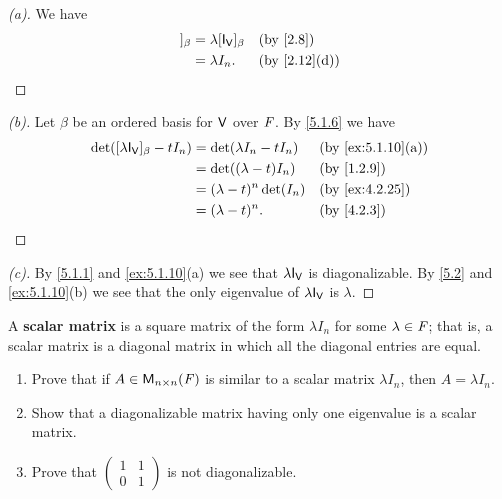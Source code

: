 \begin{proof}[(a)]
  We have
  \begin{align*}
    [\lambda \IT[\V]]_{\beta} & = \lambda [\IT[\V]]_{\beta} &  & \text{(by \cref{2.8})}     \\
                              & = \lambda I_n.              &  & \text{(by \cref{2.12}(d))}
  \end{align*}
\end{proof}

\begin{proof}[(b)]
  Let \(\beta\) be an ordered basis for \(\mathsf{V}\) over \(\mathit{F}\).
  By \cref{5.1.6} we have
  \begin{align*}
    \det([\lambda \IT[\V]]_{\beta} - t I_n) & = \det(\lambda I_n - t I_n) &  & \text{(by \cref{ex:5.1.10}(a))} \\
                                            & = \det((\lambda - t) I_n)   &  & \text{(by \cref{1.2.9})}        \\
                                            & = (\lambda - t)^n \det(I_n) &  & \text{(by \cref{ex:4.2.25})}    \\
                                            & = (\lambda - t)^n.          &  & \text{(by \cref{4.2.3})}
  \end{align*}
\end{proof}

\begin{proof}[(c)]
  By \cref{5.1.1} and \cref{ex:5.1.10}(a) we see that \(\lambda \IT[\V]\) is diagonalizable.
  By \cref{5.2} and \cref{ex:5.1.10}(b) we see that the only eigenvalue of \(\lambda \IT[\V]\) is \(\lambda\).
\end{proof}

\begin{ex}\label{ex:5.1.11}
  A \textbf{scalar matrix} is a square matrix of the form \(\lambda I_n\) for some \(\lambda \in \mathit{F}\);
  that is, a scalar matrix is a diagonal matrix in which all the diagonal entries are equal.
  \begin{enumerate}
    \item Prove that if \(A \in \mathsf{M}_{{n} \times n}({\mathit{F}})\) is similar to a scalar matrix \(\lambda I_n\), then \(A = \lambda I_n\).
    \item Show that a diagonalizable matrix having only one eigenvalue is a scalar matrix.
    \item Prove that \(\begin{pmatrix}
            1 & 1 \\
            0 & 1
          \end{pmatrix}\) is not diagonalizable.
  \end{enumerate}
\end{ex}


